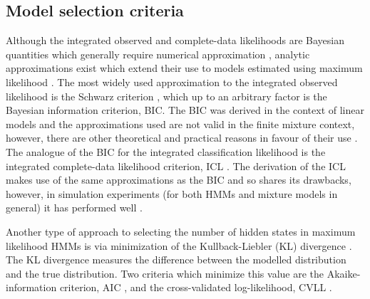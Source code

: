 \subsection{Model selection criteria}

Although the integrated observed and complete-data likelihoods are Bayesian quantities which generally require numerical approximation \cite{gelmanBayesianDataAnalysis2014}, analytic approximations exist which extend their use to models estimated using maximum likelihood \cite{kassBayesFactors1995, mclachlanFiniteMixtureModels2000}. The most widely used approximation to the integrated observed likelihood is the Schwarz criterion \cite{schwarzEstimatingDimensionModel1978a}, which up to an arbitrary factor is the Bayesian information criterion, BIC. The BIC was derived in the context of linear models and the approximations used are not valid in the finite mixture context, however, there are other theoretical and practical reasons in favour of their use \cite{fraley1998many}. The analogue of the BIC for the integrated classification likelihood is the integrated complete-data likelihood criterion, ICL \cite{biernackiAssessingMixtureModel2000a}.  The derivation of the ICL makes use of the same approximations as the BIC and so shares its drawbacks, however, in simulation experiments (for both HMMs and mixture models in general) it has performed well \cite{mclachlanFiniteMixtureModels2000,celeuxSelectingHiddenMarkov2008, biernackiAssessingMixtureModel2000a}.

Another type of approach to selecting the number of hidden states in maximum likelihood HMMs is via minimization of the Kullback-Liebler (KL) divergence \cite{kullbackInformationSufficiency1951}. The KL divergence  measures the difference between the modelled distribution and the true distribution. Two criteria which minimize this value are the Akaike-information criterion, AIC \cite{akaikeInformationTheoryExtension1998}, and the cross-validated log-likelihood, CVLL \cite{celeuxSelectingHiddenMarkov2008}.  


